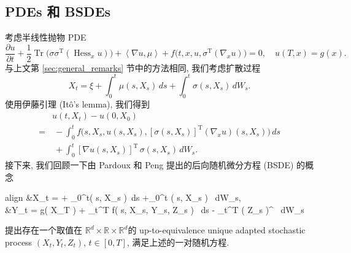 \documentclass[12pt,AutoFakeBold,AutoFakeSlant]{article}
\theoremstyle{definition}
\DeclareMathOperator{\Tr}{Tr}
\newcommand{\R}{\mathbb{R}}
\newcommand{\bx}{{x}}
\newcommand{\bX}{{X}}
\begin{document}
	\subsection{PDEs 和 BSDEs}
		考虑半线性抛物 PDE
		\begin{equation}
			\label{eq:PDE}
			\frac{ \partial u}{ \partial t } + \frac{1}{2} \! \Tr\!\big( \sigma \sigma^{\operatorname{T}} (\operatorname{Hess}_{\bx} u) \big) +\left< \nabla u, \mu \right> +f\big( t, \bx, u, \sigma^{\operatorname{T}} (\nabla_x u) \big) = 0, \quad u(T, \bx) = g(\bx).
		\end{equation}
		与上文第 \ref{sec:general_remarks} 节中的方法相同, 我们考虑扩散过程
		\begin{equation}
			\bX_t = \xi + \int_0^t\mu( s, \bX_s )\, ds +\int_0^t \sigma( s, \bX_s ) \, d W_s.
		\end{equation}
		使用伊藤引理 (It\^{o}'s lemma), 我们得到
		\begin{equation}
			\begin{split}
					&u(t, \bX_t) - u(0, \bX_0)\\
				= 	&~-\int_0^t f\big( s, \bX_s, u(s,\bX_s), [ \sigma( s, \bX_s ) ]^{ \operatorname{T} } ( \nabla_x u )( s, \bX_s ) \big) \, ds \\
					&~+ \int_0^t [ \nabla u( s, \bX_s ) ]^{ \operatorname{T} } \,\sigma( s, \bX_s )\, d W_s.
			\end{split}
		\end{equation}
		接下来, 我们回顾一下由 Pardoux 和 Peng \cite{Pardoux1992} 提出的后向随机微分方程 (BSDE) 的概念 
		\begin{empheq}[left=\empheqlbrace]{align}
		\label{eq:BSDE_1}
			&\bX_t = \xi + \int_0^t\mu( s, \bX_s )\, ds +\int_0^t \sigma( s, X_s ) \, dW_s, \\
			&Y_t = g( X_T ) + \int_t^T f( s, X_s, Y_s, Z_s ) \, ds 
			- \int_t^T ( Z_s )^{  } \, dW_s
		\label{eq:BSDE_2}
		\end{empheq}
		\cite{Pardoux1992,Pardoux1999} 提出存在一个取值在 $ \R^d \times \R \times \R^d $的 up-to-equivalence unique adapted stochastic process $ ( X_t, Y_t, Z_t ) $, $ t \in [0,T] $, 满足上述的一对随机方程.
\end{document}
